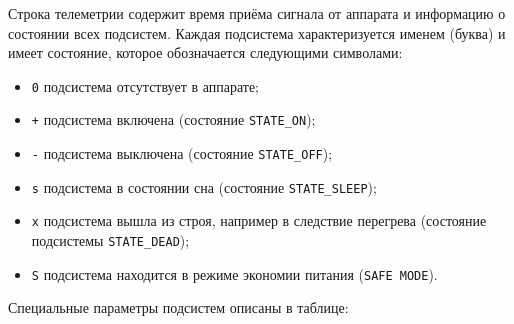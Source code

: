 \documentclass[12pt,a4paper]{article}
\begin{document}
Строка телеметрии содержит время приёма сигнала от аппарата и информацию о состоянии всех
подсистем. Каждая подсистема характеризуется именем (буква) и имеет состояние, которое
обозначается следующими символами:

\begin{itemize}
\item \verb'0' подсистема отсутствует в аппарате;
\item \verb'+' подсистема включена (состояние \verb'STATE_ON');
\item \verb'-' подсистема выключена (состояние \verb'STATE_OFF');
\item \verb's' подсистема в состоянии сна (состояние \verb'STATE_SLEEP');
\item \verb'x' подсистема вышла из строя, например в следствие перегрева (состояние
  подсистемы \verb'STATE_DEAD');
\item \verb'S' подсистема находится в режиме экономии питания (\verb'SAFE MODE').
\end{itemize}

Специальные параметры подсистем описаны в таблице:
\end{document}
